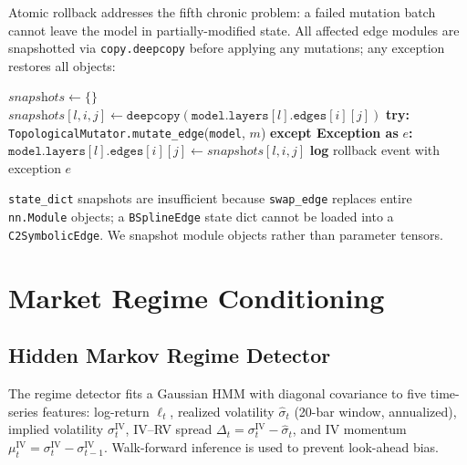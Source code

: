 \documentclass[11pt,a4paper]{article}
\begin{document}
Atomic rollback addresses the fifth chronic problem: a failed mutation batch cannot
leave the model in partially-modified state. All affected edge modules are snapshotted
via \texttt{copy.deepcopy} before applying any mutations; any exception restores all
objects:

\begin{algorithm}
\caption{Atomic Mutation Application with Rollback}
\begin{algorithmic}[1]
\State $\textit{snapshots} \leftarrow \{\}$
    \State $\textit{snapshots}[l,i,j] \leftarrow \texttt{deepcopy}(\texttt{model.layers}[l].\texttt{edges}[i][j])$
\EndFor
\State \textbf{try:}
    \State \texttt{TopologicalMutator.mutate\_edge}(\texttt{model}, $m$)
\EndFor
\State \textbf{except Exception as} $e$\textbf{:}
    \State $\texttt{model.layers}[l].\texttt{edges}[i][j] \leftarrow \textit{snapshots}[l,i,j]$
\EndFor
\State \textbf{log} rollback event with exception $e$
\end{algorithmic}
\end{algorithm}

\texttt{state\_dict} snapshots are insufficient because \texttt{swap\_edge} replaces
entire \texttt{nn.Module} objects; a \texttt{BSplineEdge} state dict cannot be loaded
into a \texttt{C2SymbolicEdge}. We snapshot module objects rather than parameter tensors.

\section{Market Regime Conditioning}
\label{sec:regime}

\subsection{Hidden Markov Regime Detector}
\label{sec:regime:hmm}

The regime detector fits a Gaussian HMM with diagonal covariance to five time-series
features: log-return $\ell_t$, realized volatility $\hat{\sigma}_t$ (20-bar window,
annualized), implied volatility $\sigma^\text{IV}_t$, IV--RV spread
$\Delta_t = \sigma^\text{IV}_t - \hat{\sigma}_t$, and IV momentum
$\mu^\text{IV}_t = \sigma^\text{IV}_t - \sigma^\text{IV}_{t-1}$.
Walk-forward inference is used to prevent look-ahead bias.
\end{document}
